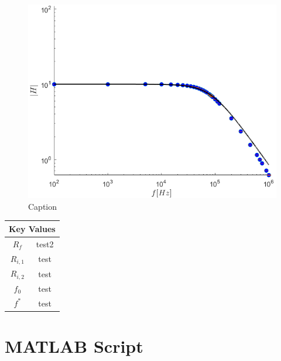 \documentclass[letterpaper,12pt]{article}
\begin{document}
\begin{figure}[ht]
    \centering
    \includegraphics[scale = .55]{LowGain.png}
    \caption{Caption}
    \label{LowG}
\end{figure}

\begin{center}
    \begin{tabular}{| c | c |}
    \multicolumn{2}{c}{Key Values} \\
    \hline
    $R_f$ & test2\\
    $R_{i,1}$ & test\\
    $R_{i,2}$ & test\\
    $f_0$ & test\\
    $f^*$ & test\\
    
    \hline
    \end{tabular}
\end{center}
\newpage
\appendix
\section{MATLAB Script}

\end{document}
